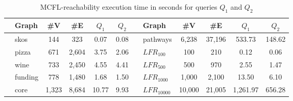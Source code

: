 {\setlength{\tabcolsep}{0.3em}
\begin{table}[ht]
\centering
\caption{MCFL-reachability execution time in seconds for queries $Q_1$ and $Q_2$}
\label{tbl:tableRDF}
\begin{tabular}{| c | p{1cm} | c | c | c | c || c | p{1.3cm} | c | c | c | c |}
    \hline
      &  Graph              & \#V & \#E  & $Q_1$  & $Q_2$ &  & Graph & \#V & \#E     & $Q_1$    & $Q_2$ \\
       \hline
       \hline
    \parbox[t]{2mm}{}
      & \small{skos}                    & 144 & 323     & 0.07  & 0.08 &
     \parbox[t]{2mm}{} & \small{pathways}                    & 6,238 & 37,196  & 533.73 &   148.62   \\
      & \small{pizza}                       & 671 & 2,604    & 3.75  & 2.06 &\parbox[t]{2mm}{} & $LFR_{100}$& 100 & 210 & 0.12 & 0.06      \\
      & \small{wine}                        & 733 & 2,450    & 4.55  & 4.41 & & $LFR_{500}$ & 500 & 970 & 2.55 & 1.47      \\
      & \small{funding}                     & 778 & 1,480    & 1.68  & 1.50 & & $LFR_{1000}$ & 1,000 & 2,100 & 13.50 & 6.10      \\
      & \small{core}                        & 1,323 & 8,684   & 10.77  &  9.93 & & $LFR_{10000}$ & 10,000& 21,005 &  1,261.97 & 656.28      \\
      \hline
  \end{tabular}
\end{table}
}

